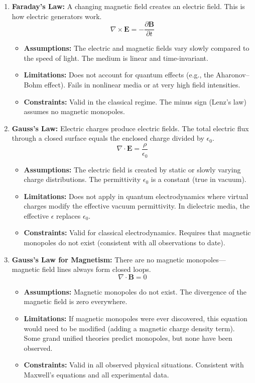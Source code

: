 \documentclass[11pt,openright]{book}
\begin{document}
\begin{enumerate}
\item \textbf{Faraday's Law:} A changing magnetic field creates an electric field. This is how electric generators work.
\[
\nabla\times\mathbf E=-\frac{\partial\mathbf B}{\partial t}
\]
\begin{itemize}
\item \textbf{Assumptions:} The electric and magnetic fields vary slowly compared to the speed of light. The medium is linear and time-invariant.
\item \textbf{Limitations:} Does not account for quantum effects (e.g., the Aharonov--Bohm effect). Fails in nonlinear media or at very high field intensities.
\item \textbf{Constraints:} Valid in the classical regime. The minus sign (Lenz's law) assumes no magnetic monopoles.
\end{itemize}

\item \textbf{Gauss's Law:} Electric charges produce electric fields. The total electric flux through a closed surface equals the enclosed charge divided by $\epsilon_0$.
\[
\nabla\cdot\mathbf E=\frac{\rho}{\epsilon_0}
\]
\begin{itemize}
\item \textbf{Assumptions:} The electric field is created by static or slowly varying charge distributions. The permittivity $\epsilon_0$ is a constant (true in vacuum).
\item \textbf{Limitations:} Does not apply in quantum electrodynamics where virtual charges modify the effective vacuum permittivity. In dielectric media, the effective $\epsilon$ replaces $\epsilon_0$.
\item \textbf{Constraints:} Valid for classical electrodynamics. Requires that magnetic monopoles do not exist (consistent with all observations to date).
\end{itemize}

\item \textbf{Gauss's Law for Magnetism:} There are no magnetic monopoles---magnetic field lines always form closed loops.
\[
\nabla\cdot\mathbf B=0
\]
\begin{itemize}
\item \textbf{Assumptions:} Magnetic monopoles do not exist. The divergence of the magnetic field is zero everywhere.
\item \textbf{Limitations:} If magnetic monopoles were ever discovered, this equation would need to be modified (adding a magnetic charge density term). Some grand unified theories predict monopoles, but none have been observed.
\item \textbf{Constraints:} Valid in all observed physical situations. Consistent with Maxwell's equations and all experimental data.
\end{itemize}


\end{enumerate}
\end{document}
